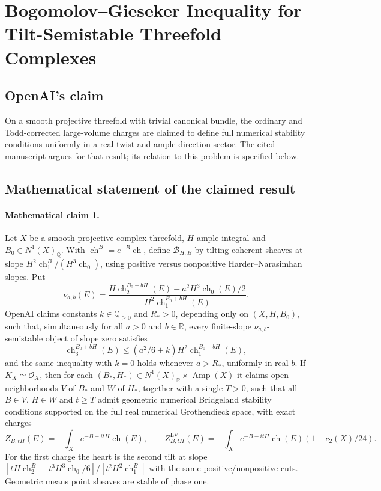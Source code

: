\documentclass[11pt]{article}
\begin{document}
\section*{Bogomolov–Gieseker Inequality for Tilt-Semistable Threefold Complexes}

\subsection{OpenAI's claim}
On a smooth projective threefold with trivial canonical bundle, the ordinary and Todd-corrected large-volume charges are claimed to define full numerical stability conditions uniformly in a real twist and ample-direction sector. The cited manuscript argues for that result; its relation to this problem is specified below.

\subsection{Mathematical statement of the claimed result}
\paragraph{Mathematical claim 1.} Let $X$ be a smooth projective complex threefold, $H$ ample integral and $B_0\in N^1(X)_{\mathbb Q}$. With $\operatorname{ch}^B=e^{-B}\operatorname{ch}$, define $\mathcal B_{H,B}$ by tilting coherent sheaves at slope $H^2\operatorname{ch}_1^B/(H^3\operatorname{ch}_0)$, using positive versus nonpositive Harder--Narasimhan slopes. Put
\[
\nu_{a,b}(E)=\frac{H\operatorname{ch}_2^{B_0+bH}(E)-a^2H^3\operatorname{ch}_0(E)/2}{H^2\operatorname{ch}_1^{B_0+bH}(E)}.
\]
OpenAI claims constants $k\in\mathbb Q_{\ge0}$ and $R_*>0$, depending only on $(X,H,B_0)$, such that, simultaneously for all $a>0$ and $b\in\mathbb R$, every finite-slope $\nu_{a,b}$-semistable object of slope zero satisfies
\[
\operatorname{ch}_3^{B_0+bH}(E)\le(a^2/6+k)H^2\operatorname{ch}_1^{B_0+bH}(E),
\]
and the same inequality with $k=0$ holds whenever $a>R_*$, uniformly in real $b$.
If $K_X\simeq\mathcal O_X$, then for each $(B_*,H_*)\in N^1(X)_{\mathbb R}\times\operatorname{Amp}(X)$ it claims open neighborhoods $V$ of $B_*$ and $W$ of $H_*$, together with a single $T>0$, such that all $B\in V$, $H\in W$ and $t\ge T$ admit geometric numerical Bridgeland stability conditions supported on the full real numerical Grothendieck space, with exact charges
\[
Z_{B,tH}(E)=-\int_Xe^{-B-itH}\operatorname{ch}(E),\qquad
Z^{\mathrm{LV}}_{B,tH}(E)=-\int_Xe^{-B-itH}\operatorname{ch}(E)(1+c_2(X)/24).
\]
For the first charge the heart is the second tilt at slope $[tH\operatorname{ch}_2^B-t^3H^3\operatorname{ch}_0/6]/[t^2H^2\operatorname{ch}_1^B]$ with the same positive/nonpositive cuts. Geometric means point sheaves are stable of phase one.
\end{document}
